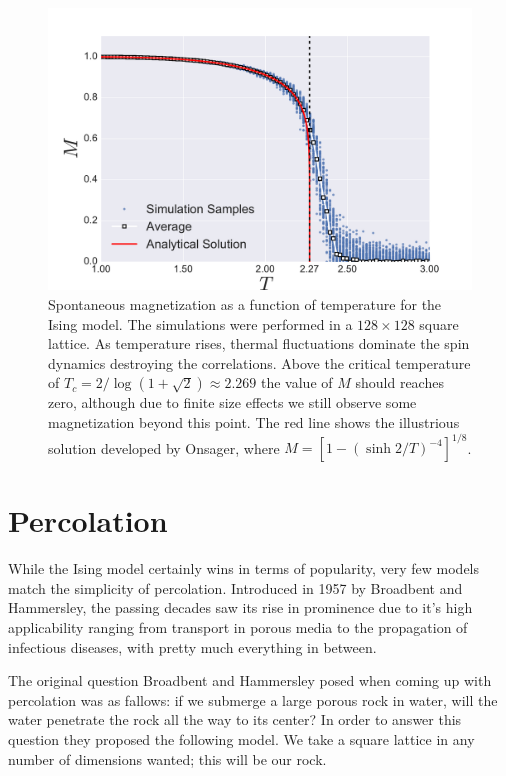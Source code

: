\begin{figure}
\begin{center}
    \includegraphics[scale=0.4]{chapters/ch2-crit/figs/ising_phase}
\end{center}
\caption{Spontaneous magnetization as a function of temperature for the Ising
    model. The simulations were performed in a $128\times128$ square lattice.
    As temperature rises, thermal fluctuations dominate the spin dynamics
    destroying the correlations. Above the critical temperature of
    $T_c=2/\log(1+\sqrt{2})\approx 2.269$ the value of $M$ should reaches zero,
    although due to finite size effects we still observe some magnetization
    beyond this point. The red line shows the illustrious solution
    developed by Onsager, where $M={[1-{(\sinh{2/T})}^{-4}]}^{1/8}$.}
\label{fig:ising_phase}
\end{figure}


\section{Percolation}
\label{sec:perc}

While the Ising model certainly wins in terms of popularity, very few models
match the simplicity of percolation. Introduced in 1957 by Broadbent and
Hammersley, the passing decades saw its rise in prominence due to it's high
applicability ranging from transport in porous media to the propagation of
infectious diseases, with pretty much everything in between.

The original question Broadbent and Hammersley posed when coming up with
percolation was as fallows: if we submerge a large porous rock in water, will
the water penetrate the rock all the way to its center? In order to answer this
question they proposed the following model. We take a square lattice in any
number of dimensions wanted; this will be our rock.

